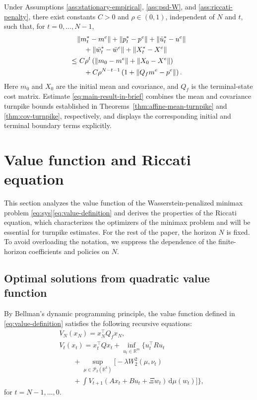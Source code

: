 \documentclass[10pt,journal,twoside]{IEEEtran}
\theoremstyle{definition}
\theoremstyle{remark}
\newcommand{\R}{\mathbb{R}}
\newcommand{\dd}{\mathrm{d}}
\begin{document}
Under Assumptions \ref{ass:stationary-empirical},
\ref{ass:psd-W}, and \ref{ass:riccati-penalty}, there exist constants \(C>0\) and
\(\rho\in(0,1)\), independent of \(N\) and \(t\), such that, for
\(t=0,\ldots,N-1\),
\begin{align}
&\|m_t^*-m^e\|
 +\|p_t^*-p^e\|
 +\|\bar{u}_t^*-u^e\|
 \notag\\
&\quad
 +\|\bar{w}_t^*-\bar w^e\|
 +\|X_t^*-X^e\|
 \notag\\
\le&~
 C\rho^t
 \left(
   \|m_0-m^e\|+\|X_0-X^e\|
 \right)
 \notag\\
&\quad+
 C\rho^{N-t-1}
 \left(
   1+\|Q_fm^e-p^e\|
 \right).
\label{eq:main-result-in-brief}
\end{align}
Here \(m_0\) and \(X_0\) are the initial mean and covariance, and
\(Q_f\) is the terminal-state cost matrix. Estimate
\eqref{eq:main-result-in-brief} combines the mean and covariance turnpike
bounds established in Theorems~\ref{thm:affine-mean-turnpike} and
\ref{thm:cov-turnpike}, respectively, and displays the corresponding
initial and terminal boundary terms explicitly.



\section{Value function and Riccati equation}
\label{sec:bellman-riccati}

This section analyzes the value function of the Wasserstein-penalized minimax problem \eqref{eq:sys}\eqref{eq:value-definition} and derives the properties of the Riccati equation, which characterizes the optimizers of the minimax problem and will be essential for turnpike estimates.
For the rest of the paper, the horizon \(N\) is fixed. To avoid overloading the notation, we suppress the dependence of the finite-horizon coefficients and policies on \(N\).


\subsection{Optimal solutions from quadratic value function}
\label{subsec:one-step-bellman}

By Bellman's dynamic programming principle, the value function defined in \eqref{eq:value-definition} satisfies the following recursive equations:
\begin{equation}
	\begin{aligned}
		&V_N(x_N)
		=x_N^\top Q_fx_N,\\
		&V_t(x_t)
		=
		x_t^\top Qx_t+
		\inf_{u_t\in\R^m} 
		\Bigg\{
		u_t^\top Ru_t                                      \\
		&\qquad+
		\sup_{\mu\in\mathcal P_2(\R^k)}
		\bigg[-\lambda W_2^2(\mu,\nu_t)\\
		&\qquad+\int V_{t+1}(Ax_t+Bu_t+\Xi w_t)\,\dd\mu(w_t)\bigg]
		\Bigg\},
	\end{aligned}
	\label{eq:Bellman-DP}
\end{equation}
for \(t=N-1,\ldots,0\).  
\end{document}
